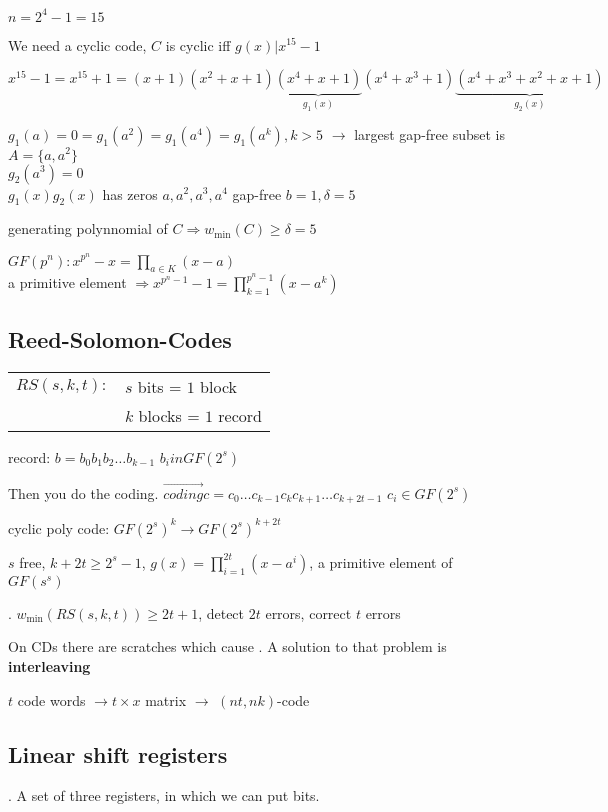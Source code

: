 $n=2^4-1=15$

We need a cyclic code, $C$ is cyclic iff $g(x)|x^{15}-1$

$x^{15}-1 = x^{15}+1 = (x+1)(x^2+x+1)\underbrace{(x^4+x+1)}_{g_1(x)}(x^4+x^3+1)\underbrace{(x^4+x^3+x^2+x+1)}_{g_2(x)}$

$g_1(a)=0= g_1(a^2)=g_1(a^4) = g_1(a^k), k>5$ $\to$ largest gap-free subset is $A=\{a,a^2\}$\\
$g_2(a^3)=0$ \\
$g_1(x)g_2(x)$ has zeros $a,a^2,a^3,a^4$ gap-free $b=1, \delta=5$

generating polynnomial of $C \Rightarrow w_{\min}(C) \geq \delta = 5$

$GF(p^n): x^{p^n} -x = \prod_{a \in K}(x-a)$ \\
a primitive element $\Rightarrow x^{p^n-1}-1 = \prod_{k=1}^{p^n-1}(x-a^k)$

\subsection{Reed-Solomon-Codes}

\begin{tabular}{ll}
  $RS(s,k,t):$ &$s$ bits = $1$ block\\
    & $k$ blocks = $1$ record\\
\end{tabular}

record: $b= b_0b_1b_2 \ldots b_{k-1}$ \quad $b_i in GF(2^s)$

Then you do the coding. $\stackrel{\to}{coding} c= c_0\ldots c_{k-1}c_{k}c_{k+1}\ldots c_{k+2t-1}$ \quad $c_i \in GF(2^s)$

cyclic poly code: $GF(2^s)^k \to GF(2^s)^{k+2t}$

$s$ free, $k+2t \geq 2^s-1$, $g(x) = \prod_{i=1}^{2t} (x-a^i)$, a primitive element of $GF(s^s)$

\Theorem.
$w_{\min}(RS(s,k,t)) \geq 2t+1$, detect $2t$ errors, correct $t$ errors

On CDs there are scratches which cause . A solution to that problem is \textbf{interleaving}

$t$ code words $\to t \times x$ matrix $\to$ $(nt,nk)$-code

\subsection{Linear shift registers}
\Example.
A set of three registers, in which we can put bits. 

